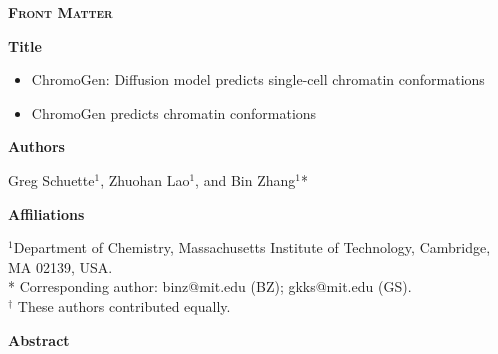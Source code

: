 \documentclass[12pt,letterpaper]{article}
\newcommand{\markblankline}{\newline\mbox{}\newline} %
\begin{document}

\begin{flushleft}

\begin{adjustwidth}{-.5in}{}
\textbf{\textsc{Front Matter}}
\end{adjustwidth}
\vspace{-.5em}
\mbox{}
\vspace{-.5em}
\begin{adjustwidth}{-.5in}{}
\textbf{Title}
\end{adjustwidth}
\begin{adjustwidth}{-.5in}{}
\vspace{-.5em}
\begin{itemize}
    \setlength\itemsep{-1em}
    \item ChromoGen: Diffusion model predicts single-cell chromatin conformations\\
    \item ChromoGen predicts chromatin conformations%
\end{itemize}
\end{adjustwidth}
\vspace{-.5em}
\mbox{}
\vspace{-.5em}
\begin{adjustwidth}{-.5in}{}
\textbf{Authors}
\end{adjustwidth}
\vspace{-.5em}
Greg Schuette$^1$\textdagger*,
Zhuohan Lao$^1$\textdagger, and
Bin Zhang$^1$*
\mbox{}\newline
\vspace{-.5em}
\begin{adjustwidth}{-.5in}{}
\textbf{Affiliations}
\end{adjustwidth}
\vspace{-.5em}
$^1$Department of Chemistry, Massachusetts Institute of Technology, Cambridge, MA 02139, USA.\\
* Corresponding author: binz@mit.edu (BZ); gkks@mit.edu (GS).\\
$^\dagger$ These authors contributed equally. 
\mbox{}\newline
\vspace{-.5em}
\begin{adjustwidth}{-.5in}{}
\textbf{Abstract}
\end{adjustwidth}
\vspace{-.5em}

\end{flushleft}
\end{document}
